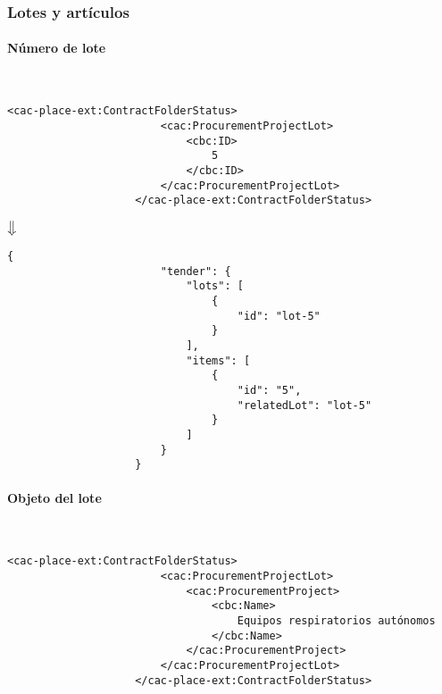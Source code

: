        \subsubsection{Lotes y artículos}
            \paragraph{Número de lote} \mbox{}\\
                \begin{lstlisting}[language=lXML]
                    <cac-place-ext:ContractFolderStatus>
                        <cac:ProcurementProjectLot>
                            <cbc:ID>
                                5
                            </cbc:ID>
                        </cac:ProcurementProjectLot>
                    </cac-place-ext:ContractFolderStatus>
                \end{lstlisting}
                
                \begin{center}
                    $\big\Downarrow$
                \end{center}
                
                \begin{lstlisting}[language=lJSON]
                    {
                        "tender": {
                            "lots": [
                                {
                                    "id": "lot-5"
                                }
                            ],
                            "items": [
                                {
                                    "id": "5",
                                    "relatedLot": "lot-5"
                                }
                            ]
                        }
                    }
                \end{lstlisting}
\newpage
            \paragraph{Objeto del lote} \mbox{}\\
                \begin{lstlisting}[language=lXML]
                    <cac-place-ext:ContractFolderStatus>
                        <cac:ProcurementProjectLot>
                            <cac:ProcurementProject>
                                <cbc:Name>
                                    Equipos respiratorios autónomos
                                </cbc:Name>
                            </cac:ProcurementProject>
                        </cac:ProcurementProjectLot>
                    </cac-place-ext:ContractFolderStatus>
                \end{lstlisting}
                
